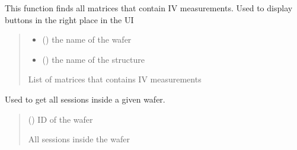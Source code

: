 \documentclass[letterpaper,10pt,english]{sphinxmanual}
\begin{document}

\begin{fulllineitems}
\label{\detokenize{getter:getter.get_matrices_with_I}}
\pysigstartsignatures
{}
\pysigstopsignatures
\sphinxAtStartPar
This function finds all matrices that contain I\sphinxhyphen{}V measurements. Used to display buttons in the right place in the UI
\begin{quote}\begin{description}
\begin{itemize}
\item {} 
\sphinxAtStartPar
{} () \textendash{} the name of the wafer

\item {} 
\sphinxAtStartPar
{} () \textendash{} the name of the structure

\end{itemize}

\sphinxAtStartPar
List of matrices that contains I\sphinxhyphen{}V measurements

\end{description}\end{quote}

\end{fulllineitems}


\begin{fulllineitems}
\label{\detokenize{getter:getter.get_sessions}}
\pysigstartsignatures
{}
\pysigstopsignatures
\sphinxAtStartPar
Used to get all sessions inside a given wafer.
\begin{quote}\begin{description}
\sphinxAtStartPar
{} () \textendash{} ID of the wafer

\sphinxAtStartPar
All sessions inside the wafer

\end{description}\end{quote}

\end{fulllineitems}
\end{document}
